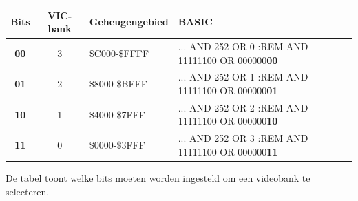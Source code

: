 {\small
\begin{tabular}{|c|c|l|l|}
	\hline
	Bits & VIC-bank & Geheugengebied & BASIC \\
	\hline
	 \textbf{00} & 3 & \$C000-\$FFFF & ... AND 252 OR 0 :REM AND 11111100 OR 000000\textbf{00} \\
	 \textbf{01} & 2 & \$8000-\$BFFF & ... AND 252 OR 1 :REM AND 11111100 OR 000000\textbf{01} \\
	 \textbf{10} & 1 & \$4000-\$7FFF & ... AND 252 OR 2 :REM AND 11111100 OR 000000\textbf{10} \\
	 \textbf{11} & 0 & \$0000-\$3FFF & ... AND 252 OR 3 :REM AND 11111100 OR 000000\textbf{11} \\
	\hline
\end{tabular}
}

De tabel toont welke bits moeten worden ingesteld om een videobank te selecteren.
